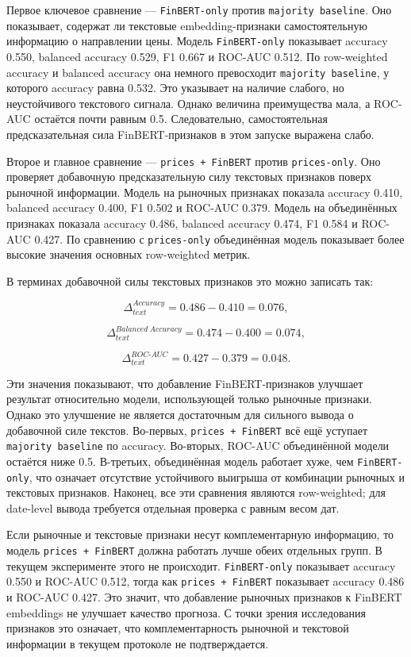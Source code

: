 Первое ключевое сравнение --- \texttt{FinBERT-only} против \texttt{majority baseline}. Оно показывает, содержат ли текстовые embedding-признаки самостоятельную информацию о направлении цены. Модель \texttt{FinBERT-only} показывает accuracy 0.550, balanced accuracy 0.529, F1 0.667 и ROC-AUC 0.512. По row-weighted accuracy и balanced accuracy она немного превосходит \texttt{majority baseline}, у которого accuracy равна 0.532. Это указывает на наличие слабого, но неустойчивого текстового сигнала. Однако величина преимущества мала, а ROC-AUC остаётся почти равным 0.5. Следовательно, самостоятельная предсказательная сила FinBERT-признаков в этом запуске выражена слабо.

Второе и главное сравнение --- \texttt{prices + FinBERT} против \texttt{prices-only}. Оно проверяет добавочную предсказательную силу текстовых признаков поверх рыночной информации. Модель на рыночных признаках показала accuracy 0.410, balanced accuracy 0.400, F1 0.502 и ROC-AUC 0.379. Модель на объединённых признаках показала accuracy 0.486, balanced accuracy 0.474, F1 0.584 и ROC-AUC 0.427. По сравнению с \texttt{prices-only} объединённая модель показывает более высокие значения основных row-weighted метрик.

В терминах добавочной силы текстовых признаков это можно записать так:

\[
\Delta_{text}^{Accuracy} = 0.486 - 0.410 = 0.076,
\]

\[
\Delta_{text}^{Balanced\ Accuracy} = 0.474 - 0.400 = 0.074,
\]

\[
\Delta_{text}^{ROC\text{-}AUC} = 0.427 - 0.379 = 0.048.
\]

Эти значения показывают, что добавление FinBERT-признаков улучшает результат относительно модели, использующей только рыночные признаки. Однако это улучшение не является достаточным для сильного вывода о добавочной силе текстов. Во-первых, \texttt{prices + FinBERT} всё ещё уступает \texttt{majority baseline} по accuracy. Во-вторых, ROC-AUC объединённой модели остаётся ниже 0.5. В-третьих, объединённая модель работает хуже, чем \texttt{FinBERT-only}, что означает отсутствие устойчивого выигрыша от комбинации рыночных и текстовых признаков. Наконец, все эти сравнения являются row-weighted; для date-level вывода требуется отдельная проверка с равным весом дат.

Если рыночные и текстовые признаки несут комплементарную информацию, то модель \texttt{prices + FinBERT} должна работать лучше обеих отдельных групп. В текущем эксперименте этого не происходит. \texttt{FinBERT-only} показывает accuracy 0.550 и ROC-AUC 0.512, тогда как \texttt{prices + FinBERT} показывает accuracy 0.486 и ROC-AUC 0.427. Это значит, что добавление рыночных признаков к FinBERT embeddings не улучшает качество прогноза. С точки зрения исследования признаков это означает, что комплементарность рыночной и текстовой информации в текущем протоколе не подтверждается.

